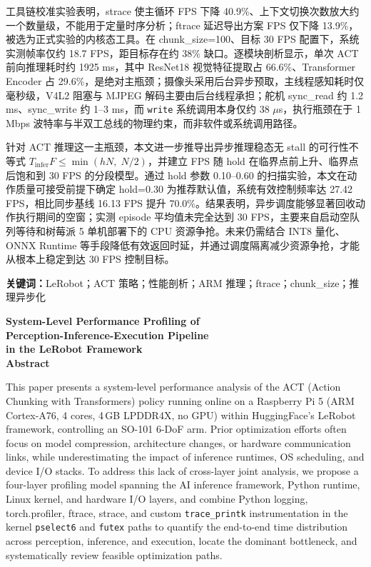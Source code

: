 \documentclass[12pt, a4paper, fontset=macnew]{ctexart}
\begin{document}
工具链校准实验表明，strace 使主循环 FPS 下降 40.9\%、上下文切换次数放大约一个数量级，不能用于定量时序分析；ftrace 延迟导出方案 FPS 仅下降 13.9\%，被选为正式实验的内核态工具。在 chunk\_size=100、目标 30 FPS 配置下，系统实测帧率仅约 18.7 FPS，距目标存在约 38\% 缺口。逐模块剖析显示，单次 ACT 前向推理耗时约 1925 ms，其中 ResNet18 视觉特征提取占 66.6\%、Transformer Encoder 占 29.6\%，是绝对主瓶颈；摄像头采用后台异步预取，主线程感知耗时仅毫秒级，V4L2 阻塞与 MJPEG 解码主要由后台线程承担；舵机 sync\_read 约 1.2 ms、sync\_write 约 1--3 ms，而 \texttt{write} 系统调用本身仅约 38 \(\mu\)s，执行瓶颈在于 1 Mbps 波特率与半双工总线的物理约束，而非软件或系统调用路径。

针对 ACT 推理这一主瓶颈，本文进一步推导出异步推理稳态无 stall 的可行性不等式 \(T_{\text{infer}}F \leq \min(hN,\;N/2)\)，并建立 FPS 随 hold 在临界点前上升、临界点后饱和到 30 FPS 的分段模型。通过 hold 参数 0.10--0.60 的扫描实验，本文在动作质量可接受前提下确定 hold=0.30 为推荐默认值，系统有效控制频率达 27.42 FPS，相比同步基线 16.13 FPS 提升 70.0\%。结果表明，异步调度能够显著回收动作执行期间的空窗；实测 episode 平均值未完全达到 30 FPS，主要来自启动空队列等待和树莓派 5 单机部署下的 CPU 资源争抢。未来仍需结合 INT8 量化、ONNX Runtime 等手段降低有效返回时延，并通过调度隔离减少资源争抢，才能从根本上稳定到达 30 FPS 控制目标。

\vspace{1.5em}
{\heiti\bfseries 关键词：}{\songti LeRobot；ACT 策略；性能剖析；ARM 推理；ftrace；chunk\_size；推理异步化}

\clearpage

\begin{center}
  {\rmfamily\bfseries
    System-Level Performance Profiling of\\[4pt]
    Perception-Inference-Execution Pipeline\\[4pt]
    in the LeRobot Framework}\\[1.2em]
  {\rmfamily\bfseries Abstract}
\end{center}

\vspace{1em}
\rmfamily
This paper presents a system-level performance analysis of the ACT (Action Chunking with Transformers)
policy running online on a Raspberry Pi 5 (ARM Cortex-A76, 4 cores, 4\,GB LPDDR4X, no GPU) within
HuggingFace's LeRobot framework, controlling an SO-101 6-DoF arm. Prior optimization efforts often
focus on model compression, architecture changes, or hardware communication links, while underestimating
the impact of inference runtimes, OS scheduling, and device I/O stacks. To address this lack of
cross-layer joint analysis, we propose a four-layer profiling model spanning the AI inference framework,
Python runtime, Linux kernel, and hardware I/O layers, and combine Python logging, torch.profiler,
ftrace, strace, and custom \texttt{trace\_printk} instrumentation in the kernel \texttt{pselect6} and
\texttt{futex} paths to quantify the end-to-end time distribution across perception, inference, and
execution, locate the dominant bottleneck, and systematically review feasible optimization paths.
\end{document}
